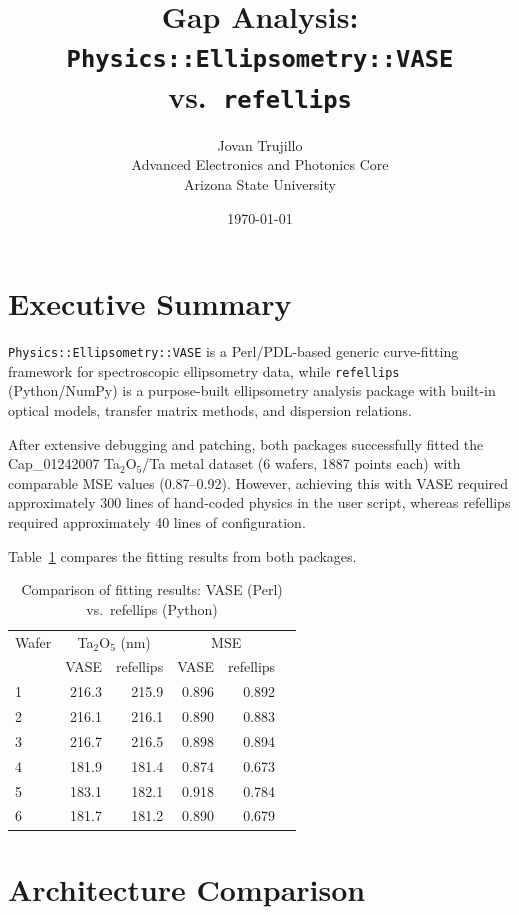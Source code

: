 \documentclass[11pt]{article}
\title{Gap Analysis:\\
\texttt{Physics::Ellipsometry::VASE} vs.\ \texttt{refellips}}
\author{Jovan Trujillo\\
Advanced Electronics and Photonics Core\\
Arizona State University}
\date{\today}
\begin{document}
\maketitle

\section{Executive Summary}

\texttt{Physics::Ellipsometry::VASE} is a Perl/PDL-based generic curve-fitting
framework for spectroscopic ellipsometry data, while \texttt{refellips}
(Python/NumPy) is a purpose-built ellipsometry analysis package with
built-in optical models, transfer matrix methods, and dispersion relations.

After extensive debugging and patching, both packages successfully fitted
the Cap\_01242007 Ta$_2$O$_5$/Ta metal dataset (6 wafers, 1887 points each)
with comparable MSE values (0.87--0.92). However, achieving this with VASE
required approximately 300 lines of hand-coded physics in the user script,
whereas refellips required approximately 40 lines of configuration.

Table~\ref{tab:results} compares the fitting results from both packages.

\begin{table}[h]
\centering
\caption{Comparison of fitting results: VASE (Perl) vs.\ refellips (Python)}
\label{tab:results}
\begin{tabular}{lrrrrr}
\toprule
Wafer & \multicolumn{2}{c}{Ta$_2$O$_5$ (nm)} & \multicolumn{2}{c}{MSE} \\
      & VASE & refellips & VASE & refellips \\
\midrule
1 & 216.3 & 215.9 & 0.896 & 0.892 \\
2 & 216.1 & 216.1 & 0.890 & 0.883 \\
3 & 216.7 & 216.5 & 0.898 & 0.894 \\
4 & 181.9 & 181.4 & 0.874 & 0.673 \\
5 & 183.1 & 182.1 & 0.918 & 0.784 \\
6 & 181.7 & 181.2 & 0.890 & 0.679 \\
\bottomrule
\end{tabular}
\end{table}

\section{Architecture Comparison}
\end{document}
